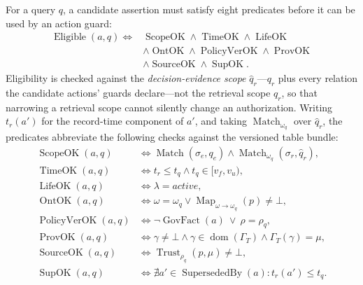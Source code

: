 \documentclass[conference]{IEEEtran}
\begin{document}
For a query $q$, a candidate assertion must satisfy eight predicates before it can be used by an action guard:
\begin{equation}
\begin{split}
\operatorname{Eligible}(a,q)\Leftrightarrow{}&
\operatorname{ScopeOK}\land\operatorname{TimeOK}\land\operatorname{LifeOK}\\
&\land\operatorname{OntOK}\land\operatorname{PolicyVerOK}\land\operatorname{ProvOK}\\
&\land\operatorname{SourceOK}\land\operatorname{SupOK}.
\end{split}
\label{eq:eligible}
\end{equation}
Eligibility is checked against the \emph{decision-evidence scope} $\hat q_r$---$q_r$ plus every relation the candidate actions' guards declare---not the retrieval scope $q_r$, so that narrowing a retrieval scope cannot silently change an authorization. Writing $t_r(a')$ for the record-time component of $a'$, and taking $\operatorname{Match}_{\omega_q}$ over $\hat q_r$, the predicates abbreviate the following checks against the versioned table bundle:
{\small
\begin{equation}
\begin{aligned}
\operatorname{ScopeOK}(a,q)&\Leftrightarrow
  \operatorname{Match}(\sigma_e,q_e)\land\operatorname{Match}_{\omega_q}(\sigma_r,\hat q_r),\\
\operatorname{TimeOK}(a,q)&\Leftrightarrow t_r\leq t_q\land t_q\in[v_f,v_u),\\
\operatorname{LifeOK}(a,q)&\Leftrightarrow \lambda=\mathit{active},\\
\operatorname{OntOK}(a,q)&\Leftrightarrow \omega=\omega_q
  \lor\operatorname{Map}_{\omega\rightarrow\omega_q}(p)\neq\bot,\\
\operatorname{PolicyVerOK}(a,q)&\Leftrightarrow
  \neg\operatorname{GovFact}(a)\ \lor\ \rho=\rho_q,\\
\operatorname{ProvOK}(a,q)&\Leftrightarrow
  \gamma\neq\bot\land\gamma\in\operatorname{dom}(\Gamma_T)\land\Gamma_T(\gamma)=\mu,\\
\operatorname{SourceOK}(a,q)&\Leftrightarrow
  \operatorname{Trust}_{\rho_q}(\hat p,\mu)\neq\bot,\\
\operatorname{SupOK}(a,q)&\Leftrightarrow
  \nexists a'\in \operatorname{SupersededBy}(a):t_r(a')\leq t_q.
\end{aligned}
\label{eq:predicates}
\end{equation}
}
\end{document}

